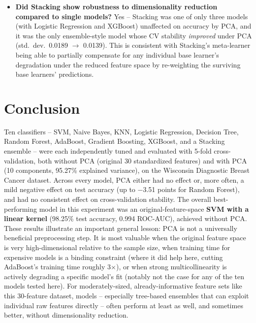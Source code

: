 \documentclass[12pt,a4paper]{article}
\DeclareRobustCommand{\_}{\textunderscore\allowbreak}
\begin{document}
\begin{itemize}
Boosting) were more negatively affected than either linear model,
consistent with their reliance on splitting individual original features.
\item \textbf{Did Stacking show robustness to dimensionality reduction
compared to single models?} Yes -- Stacking was one of only three models
(with Logistic Regression and XGBoost) unaffected on accuracy by PCA, and
it was the only ensemble-style model whose CV stability \emph{improved}
under PCA (std.\ dev.\ 0.0189 $\to$ 0.0139). This is consistent with
Stacking's meta-learner being able to partially compensate for any
individual base learner's degradation under the reduced feature space by
re-weighting the surviving base learners' predictions.
\end{itemize}

\section{Conclusion}
Ten classifiers -- SVM, Naive Bayes, KNN, Logistic Regression, Decision
Tree, Random Forest, AdaBoost, Gradient Boosting, XGBoost, and a Stacking
ensemble -- were each independently tuned and evaluated with 5-fold
cross-validation, both without PCA (original 30 standardized features) and
with PCA (10 components, 95.27\% explained variance), on the Wisconsin
Diagnostic Breast Cancer dataset. Across every model, PCA either had no
effect or, more often, a mild negative effect on test accuracy (up to
$-$3.51 points for Random Forest), and had no consistent effect on
cross-validation stability. The overall best-performing model in this
experiment was an original-feature-space \textbf{SVM with a linear kernel}
(98.25\% test accuracy, 0.994 ROC-AUC), achieved without PCA. These
results illustrate an important general lesson: PCA is not a universally
beneficial preprocessing step. It is most valuable when the original
feature space is very high-dimensional relative to the sample size, when
training time for expensive models is a binding constraint (where it did
help here, cutting AdaBoost's training time roughly 3$\times$), or when
strong multicollinearity is actively degrading a specific model's fit
(notably not the case for any of the ten models tested here). For
moderately-sized, already-informative feature sets like this 30-feature
dataset, models -- especially tree-based ensembles that can exploit
individual raw features directly -- often perform at least as well, and
sometimes better, without dimensionality reduction.
\end{document}
